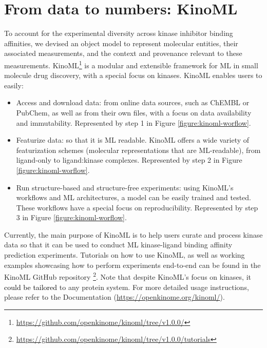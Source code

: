 \documentclass[9pt,lessons, pubversion]{livecoms}
\newcommand{\revision}[1]{\textcolor{black}{#1}}
\begin{document}

\section{From data to numbers: KinoML}

To account for the experimental diversity across kinase inhibitor binding affinities, we devised an object model to represent molecular entities, their associated measurements, and the context and provenance relevant to these measurements. KinoML\footnote{\url{https://github.com/openkinome/kinoml/tree/v1.0.0/}} is a modular and extensible framework for ML in small molecule drug discovery, with a special focus on kinases. KinoML enables users to easily:
\begin{itemize}
    \item  Access and download data: from online data sources, such as ChEMBL or PubChem, as well as from their own files, with a focus on data availability and immutability. Represented by step 1 in Figure \ref{figure:kinoml-worflow}.
    \item Featurize data: so that it is ML readable. KinoML offers a wide variety of featurization schemes (molecular representations that are ML-readable), from ligand-only to ligand:kinase complexes. Represented by step 2 in Figure \ref{figure:kinoml-worflow}.
    \item Run structure-based and structure-free experiments: using KinoML's workflows and ML architectures, a model can be easily trained and tested. These workflows have a special focus on reproducibility. Represented by step 3 in Figure \ref{figure:kinoml-worflow}.
\end{itemize}
Currently, the main purpose of KinoML is to help users curate and process kinase data so that it can be used to conduct ML kinase-ligand binding affinity prediction experiments. Tutorials on how to use KinoML, as well as working examples showcasing how to perform experiments end-to-end can be found in the KinoML GitHub repository \footnote{\url{https://github.com/openkinome/kinoml/tree/v1.0.0/tutorials}}. Note that despite KinoML's focus on kinases, it \revision{could be tailored} to any protein system. For more detailed usage instructions, please refer to the Documentation (\url{https://openkinome.org/kinoml/}). \\
\end{document}
